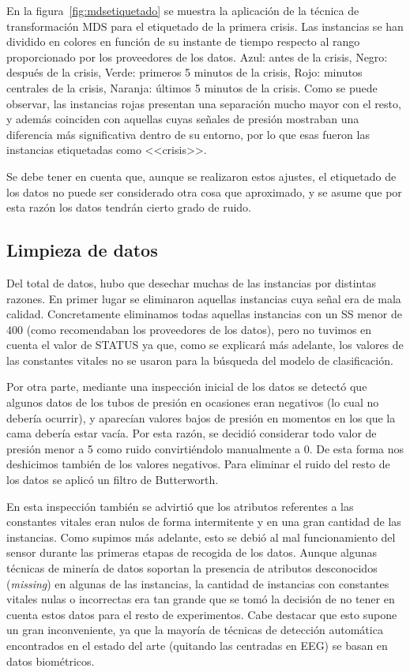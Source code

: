 En la figura~\ref{fig:mdsetiquetado} se muestra la aplicación de la técnica de transformación MDS para el etiquetado de la primera crisis. Las instancias se han dividido en colores en función de su instante de tiempo respecto al rango proporcionado por los proveedores de los datos. Azul: antes de la crisis, Negro: después de la crisis, Verde: primeros 5 minutos de la crisis, Rojo: minutos centrales de la crisis, Naranja: últimos 5 minutos de la crisis. Como se puede observar, las instancias rojas presentan una separación mucho mayor con el resto, y además coinciden con aquellas cuyas señales de presión mostraban una diferencia más significativa dentro de su entorno, por lo que esas fueron las instancias etiquetadas como <<crisis>>. 

Se debe tener en cuenta que, aunque se realizaron estos ajustes, el etiquetado de los datos no puede ser considerado otra cosa que aproximado, y se asume que por esta razón los datos tendrán cierto grado de ruido. 

\subsection{Limpieza de datos}

Del total de datos, hubo que desechar muchas de las instancias por distintas razones. En primer lugar se eliminaron aquellas instancias cuya señal era de mala calidad. Concretamente eliminamos todas aquellas instancias con un SS menor de 400 (como recomendaban los proveedores de los datos), pero no tuvimos en cuenta el valor de STATUS ya que, como se explicará más adelante, los valores de las constantes vitales no se usaron para la búsqueda del modelo de clasificación.

Por otra parte, mediante una inspección inicial de los datos se detectó que algunos datos de los tubos de presión en ocasiones eran negativos (lo cual no debería ocurrir), y aparecían valores bajos de presión en momentos en los que la cama debería estar vacía. Por esta razón, se decidió considerar todo valor de presión menor a 5 como ruido convirtiéndolo manualmente a 0. De esta forma nos deshicimos también de los valores negativos. Para eliminar el ruido del resto de los datos se aplicó un filtro de Butterworth.

En esta inspección también se advirtió que los atributos referentes a las constantes vitales eran nulos de forma intermitente y en una gran cantidad de las instancias. Como supimos más adelante, esto se debió al mal funcionamiento del sensor durante las primeras etapas de recogida de los datos. Aunque algunas técnicas de minería de datos soportan la presencia de atributos desconocidos (\textit{missing}) en algunas de las instancias, la cantidad de instancias con constantes vitales nulas o incorrectas era tan grande que se tomó la decisión de no tener en cuenta estos datos para el resto de experimentos. Cabe destacar que esto supone un gran inconveniente, ya que la mayoría de técnicas de detección automática encontrados en el estado del arte (quitando las centradas en EEG) se basan en datos biométricos. 

